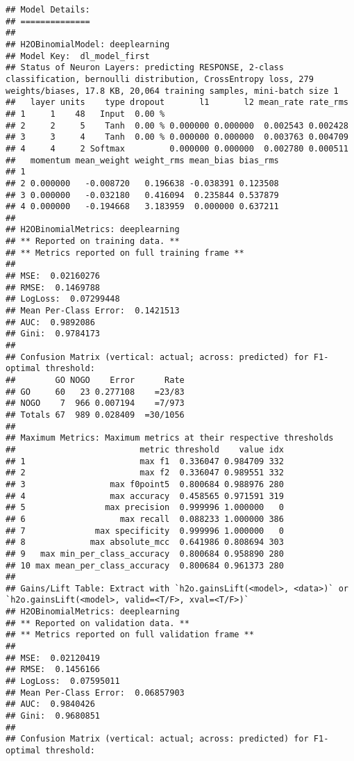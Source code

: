 \documentclass[]{article}
\begin{document}
\begin{verbatim}
## Model Details:
## ==============
## 
## H2OBinomialModel: deeplearning
## Model Key:  dl_model_first 
## Status of Neuron Layers: predicting RESPONSE, 2-class classification, bernoulli distribution, CrossEntropy loss, 279 weights/biases, 17.8 KB, 20,064 training samples, mini-batch size 1
##   layer units    type dropout       l1       l2 mean_rate rate_rms
## 1     1    48   Input  0.00 %                                     
## 2     2     5    Tanh  0.00 % 0.000000 0.000000  0.002543 0.002428
## 3     3     4    Tanh  0.00 % 0.000000 0.000000  0.003763 0.004709
## 4     4     2 Softmax         0.000000 0.000000  0.002780 0.000511
##   momentum mean_weight weight_rms mean_bias bias_rms
## 1                                                   
## 2 0.000000   -0.008720   0.196638 -0.038391 0.123508
## 3 0.000000   -0.032180   0.416094  0.235844 0.537879
## 4 0.000000   -0.194668   3.183959  0.000000 0.637211
## 
## H2OBinomialMetrics: deeplearning
## ** Reported on training data. **
## ** Metrics reported on full training frame **
## 
## MSE:  0.02160276
## RMSE:  0.1469788
## LogLoss:  0.07299448
## Mean Per-Class Error:  0.1421513
## AUC:  0.9892086
## Gini:  0.9784173
## 
## Confusion Matrix (vertical: actual; across: predicted) for F1-optimal threshold:
##        GO NOGO    Error      Rate
## GO     60   23 0.277108    =23/83
## NOGO    7  966 0.007194    =7/973
## Totals 67  989 0.028409  =30/1056
## 
## Maximum Metrics: Maximum metrics at their respective thresholds
##                         metric threshold    value idx
## 1                       max f1  0.336047 0.984709 332
## 2                       max f2  0.336047 0.989551 332
## 3                 max f0point5  0.800684 0.988976 280
## 4                 max accuracy  0.458565 0.971591 319
## 5                max precision  0.999996 1.000000   0
## 6                   max recall  0.088233 1.000000 386
## 7              max specificity  0.999996 1.000000   0
## 8             max absolute_mcc  0.641986 0.808694 303
## 9   max min_per_class_accuracy  0.800684 0.958890 280
## 10 max mean_per_class_accuracy  0.800684 0.961373 280
## 
## Gains/Lift Table: Extract with `h2o.gainsLift(<model>, <data>)` or `h2o.gainsLift(<model>, valid=<T/F>, xval=<T/F>)`
## H2OBinomialMetrics: deeplearning
## ** Reported on validation data. **
## ** Metrics reported on full validation frame **
## 
## MSE:  0.02120419
## RMSE:  0.1456166
## LogLoss:  0.07595011
## Mean Per-Class Error:  0.06857903
## AUC:  0.9840426
## Gini:  0.9680851
## 
## Confusion Matrix (vertical: actual; across: predicted) for F1-optimal threshold:

\end{verbatim}
\end{document}
